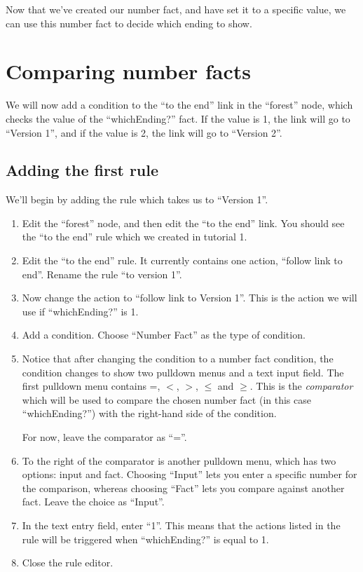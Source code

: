 \documentclass{article}
\begin{document}
\noindent Now that we've created our number fact, and have set it to a specific 
value, we can use this number fact to decide which ending to show.

\section{Comparing number facts}

We will now add a condition to the ``to the end'' link in the 
``forest'' node, which checks the value of the ``whichEnding?'' fact. 
If the value is 1, the link will go to ``Version 1'', and if the 
value is 2, the link will go to ``Version 2''.

\subsection{Adding the first rule}

We'll begin by adding the rule which takes us to ``Version 1''.

\begin{enumerate}
    \item Edit the ``forest'' node, and then edit the ``to the end'' 
    link. You should see the ``to the end'' rule which we created in 
    tutorial 1.
    \item Edit the ``to the end'' rule. It currently contains one 
    action, ``follow link to end''. Rename the rule ``to version 1''.
    \item Now change the action to ``follow link to Version 1''. This 
    is the action we will use if ``whichEnding?'' is 1.
    \item Add a condition. Choose ``Number Fact'' as the type of 
    condition.
    \item Notice that after changing the condition to a number fact 
    condition, the condition changes to show two pulldown menus and a 
    text input field. The first pulldown menu contains =, $<$, $>$, 
    $\le$ and $\ge$. This is the \textit{comparator} 
    which will be used to compare the chosen number fact (in this 
    case ``whichEnding?'') with the right-hand side of the condition.
    
    For now, leave the comparator as ``=''.
    \item To the right of the comparator is another pulldown menu, 
    which has two options: input and fact. Choosing ``Input'' lets 
    you enter a specific number for the comparison, whereas choosing 
    ``Fact'' lets you compare against another fact. Leave the choice 
    as ``Input''.
    \item In the text entry field, enter ``1''. This means that the 
    actions listed in the rule will be triggered when 
    ``whichEnding?'' is equal to 1.
    \item Close the rule editor.
\end{enumerate}
\end{document}
